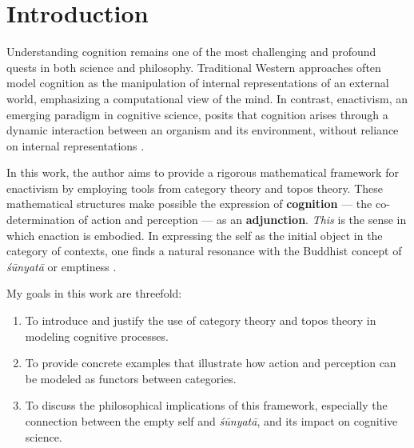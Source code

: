 \documentclass{article}
\begin{document}
\newpage




\tableofcontents

\section{Introduction}

Understanding cognition remains one of the most challenging and profound quests in both science and philosophy. Traditional Western approaches often model cognition as the manipulation of internal representations of an external world, emphasizing a computational view of the mind. In contrast, enactivism, an emerging paradigm in cognitive science, posits that cognition arises through a dynamic interaction between an organism and its environment, without reliance on internal representations \cite{varela1991}.

In this work, the author aims to provide a rigorous mathematical framework for enactivism by employing tools from category theory and topos theory. These mathematical structures make possible the expression of \textbf{cognition} --- the co-determination of action and perception --- as an \textbf{adjunction}. \emph{This} is the sense in which enaction is embodied. In expressing the self as the initial object in the category of contexts, one finds a natural resonance with the Buddhist concept of \emph{śūnyatā} or emptiness \cite{garfield1995}.

My goals in this work are threefold:

\begin{enumerate}
    \item To introduce and justify the use of category theory and topos theory in modeling cognitive processes.
    \item To provide concrete examples that illustrate how action and perception can be modeled as functors between categories.
    \item To discuss the philosophical implications of this framework, especially the connection between the empty self and \emph{śūnyatā}, and its impact on cognitive science.

\end{enumerate}
\end{document}
